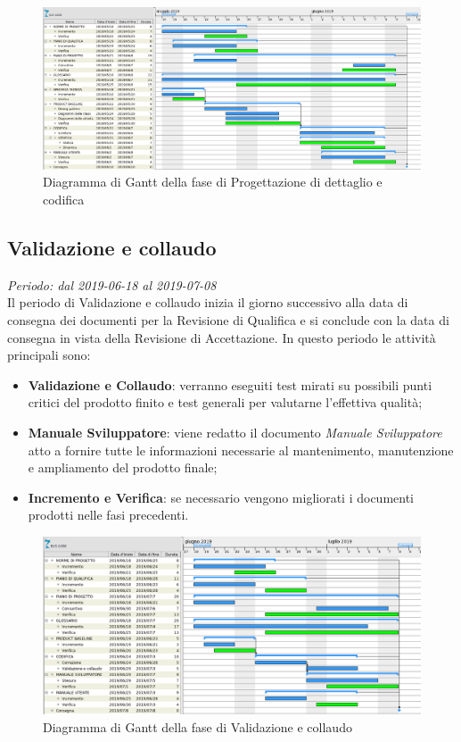 \begin{figure}[H]
	\includegraphics[width=0.99\linewidth]{res/images/gantt_pd.png}
	\caption{Diagramma di Gantt della fase di Progettazione di dettaglio e codifica}
\end{figure}
\pagebreak


\subsection{Validazione e collaudo}
\textit{Periodo: dal 2019-06-18 al 2019-07-08 } \\
Il periodo di Validazione e collaudo inizia il giorno successivo alla data di consegna dei documenti per la 
Revisione di Qualifica e si conclude con la data di consegna in vista della Revisione di Accettazione. In questo periodo le attività principali sono:
\begin{itemize}
	\item \textbf{Validazione e Collaudo}: verranno eseguiti test mirati su possibili punti critici del prodotto finito e test generali per valutarne l'effettiva qualità;
	\item \textbf{Manuale Sviluppatore}: viene redatto il documento \textit{Manuale Sviluppatore} atto a fornire tutte le informazioni necessarie al mantenimento, manutenzione e ampliamento del prodotto finale;
	\item \textbf{Incremento e Verifica}: se necessario vengono migliorati i 
	documenti prodotti nelle fasi precedenti.
\end{itemize}
\begin{figure}[H]
	\includegraphics[width=0.99\linewidth]{res/images/gantt_val.png}
	\caption{Diagramma di Gantt della fase di Validazione e collaudo}
\end{figure}